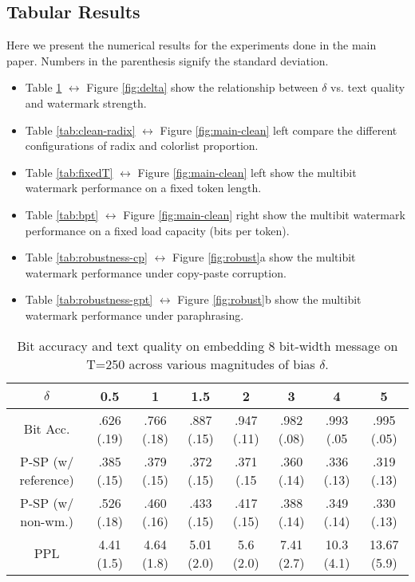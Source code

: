 \subsection{Tabular Results}\label{appendix:tables}
Here we present the numerical results for the experiments done in the main paper. Numbers in the parenthesis signify the standard deviation. 
\begin{itemize}
    \item Table \ref{tab:delta} $\leftrightarrow$ Figure \ref{fig:delta} show the relationship between $\delta$ vs. text quality and watermark strength.
    \item Table \ref{tab:clean-radix} $\leftrightarrow$ Figure \ref{fig:main-clean} left compare the different configurations of radix and colorlist proportion. 
    \item Table \ref{tab:fixedT} $\leftrightarrow$ Figure \ref{fig:main-clean} left show the multibit watermark performance on a fixed token length.
    \item Table \ref{tab:bpt} $\leftrightarrow$ Figure \ref{fig:main-clean} right show the multibit watermark performance on a fixed load capacity (bits per token). 
    \item Table \ref{tab:robustness-cp} $\leftrightarrow$ Figure \ref{fig:robust}a show the multibit watermark performance under copy-paste corruption. 
    \item Table \ref{tab:robustness-gpt} $\leftrightarrow$ Figure \ref{fig:robust}b show the multibit watermark performance under paraphrasing. 
\end{itemize}



\begin{table}[h]
\small
\centering
\begin{tabular}{c|ccccccc}
\toprule
$\delta$ & 0.5 & 1 & 1.5 & 2 & 3  & 4 & 5 \\\hline
Bit Acc.  & .626 (.19) & .766 (.18) & .887 (.15) & .947 (.11) & .982 (.08) & .993 (.05  & .995 (.05)  \\ 
P-SP (w/ reference) & .385 (.15) & .379 (.15) & .372 (.15) & .371 (.15  & .360 (.14) & .336 (.13) & .319 (.13)  \\
P-SP (w/ non-wm.) & .526 (.18) & .460 (.16) & .433 (.15) & .417 (.15) & .388 (.14) & .349 (.14) & .330 (.13)  \\
PPL & 4.41 (1.5) & 4.64 (1.8) & 5.01 (2.0) & 5.6 (2.0)  & 7.41 (2.7) & 10.3 (4.1) & 13.67 (5.9) \\ 
\bottomrule
\end{tabular}
\caption{Bit accuracy and text quality on embedding 8 bit-width message on T=250 across various magnitudes of bias $\delta$.} \label{tab:delta}
\end{table}


